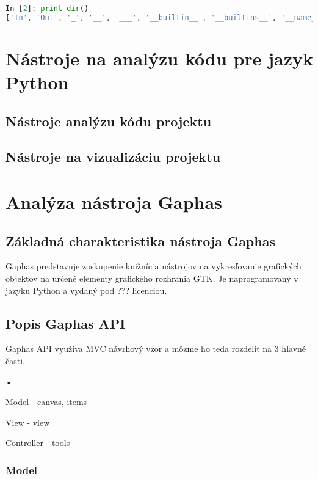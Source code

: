 \documentclass[11pt,oneside,final]{fithesis2}
\begin{document}
\begin{lstlisting}[language=python]
In [2]: print dir()
['In', 'Out', '_', '__', '___', '__builtin__', '__builtins__', '__name__', '_dh', '_i', '_i1', '_i2', '_ih', '_ii', '_iii', '_oh', '_sh', 'exit', 'get_ipython', 'help', 'quit']

\end{lstlisting}
	

\chapter{Nástroje na analýzu kódu pre jazyk Python}
	\section{Nástroje analýzu kódu projektu}	
	\section{Nástroje na vizualizáciu projektu}
    
\chapter{Analýza nástroja Gaphas}

	\section{Základná charakteristika nástroja Gaphas}

		Gaphas predstavuje zoskupenie knižníc a nástrojov na vykresľovanie grafických objektov na určené elementy grafického rozhrania GTK. Je naprogramovaný v jazyku Python a vydaný pod ??? licenciou.

	\section{Popis Gaphas API}

Gaphas API využíva MVC návrhový vzor a môzme ho teda rozdeliť na 3 hlavné časti.
\begin{list}{•}{}
\item Model - canvas, items
\item View - view
\item Controller - tools
\end{list}

\subsection{Model}
\end{document}
